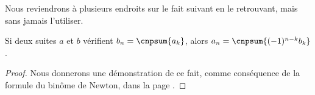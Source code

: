 Nous reviendrons à plusieurs endroits sur le fait suivant en le retrouvant, mais sans jamais l'utiliser.


\begin{fact} \label{pascal-inv}
    Si deux suites $a$ et $b$ vérifient
    $b_n = \cnpsum{a_k}$,
    alors
    $a_n = \cnpsum{(-1)^{n-k} b_k}$.
\end{fact}


\begin{proof}
    Nous donnerons une démonstration de ce fait, comme conséquence de la formule du binôme de Newton, dans la  page \pageref{easy-pascal-inv}.
\end{proof}
